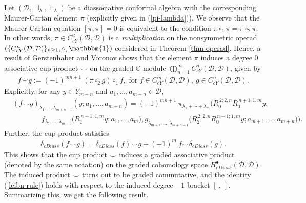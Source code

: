 \documentclass[a4paper,reqno,10pt]{amsart}
\theoremstyle{plain}
\theoremstyle{definition}
\theoremstyle{remark}
\newcommand{\C}{\mathbb{C}}
\newcommand{\D}{\mathcal{D}}
\newcommand{\la}{\lambda}
\begin{document}
Let $(\D, \dashv_\la, \vdash_\la)$ be a diassociative conformal algebra with the corresponding Maurer-Cartan element $\pi$ (explicitly given in (\ref{pi-lambda})). We observe that the Maurer-Cartan equation $[\pi , \pi ] = 0$ is equivalent to the condition $\pi \circ_1 \pi = \pi \circ_2 \pi$. In other words, $\pi \in C^2_{cY} (\D, \D)$ is a {\em multiplication} on the nonsymmetric operad $(\{C_{cY}^{n}(\D,\D)\}_{n \geq 1}, \circ, \mathbbm{1})$ considered in Theorem \ref{thm-operad}. Hence, a result of Gerstenhaber and Voronov \cite{gers-voro} shows that the element $\pi$ induces a degree $0$ associative cup product $\smile$ on the graded $\C$-module $\bigoplus_{n =1 }^{\infty} C_{cY}^{n}(\D,\D)$, given by
\begin{align*}
    f \smile g := (-1)^{mn+1} ~ \! (\pi \circ_{2} g) \circ_{1} f, \text{ for } f \in C_{cY}^{m}(\D,\D), ~ \! g \in C_{cY}^{n}(\D,\D).
\end{align*}
Explicitly, for any $y \in Y_{m+n}$ and $a_1, \ldots, a_{m+n} \in \D$,
\begin{align}\label{cup-pro}
    &(f\smile g)_{\la_1,\ldots,\la_{m+n-1}}
(y;a_1,\ldots,a_{m+n}) \nonumber
=(-1)^{mn+1} ~ \!
\pi_{\la_1+\cdots+\la_m}
\big(
R_0^{\,2;2,n}R_0^{\,n+1;1,m}y;
\nonumber\\
&\qquad \qquad
f_{\la_1,\ldots,\la_{m-1}}
\big(R_1^{\,n+1;1,m}y;a_1,\ldots,a_m\big),
g_{\la_{m+1},\ldots,\la_{m+n-1}}
\big(
R_2^{\,2;2,n}R_0^{\,n+1;1,m}y;
a_{m+1},\ldots,a_{m+n}
\big)
\big).
\end{align}
\medskip
Further, the cup product satisfies
\begin{align*}
    \delta_{cDiass}(f \smile g) = \delta_{cDiass}(f) \smile g + (-1)^{m} ~ \! f \smile \delta_{cDiass}(g).
\end{align*}
This shows that the cup product $\smile$ induces a graded associative product (denoted by the same notation) on the graded cohomology space $H^\bullet_{cDiass} (\D, \D)$. The induced product $\smile$ turns out to be graded commutative, and the identity (\ref{leibn-rule}) holds with respect to the induced degree $-1$ bracket $[~,~]$. Summarizing this, we get the following result.
\end{document}
